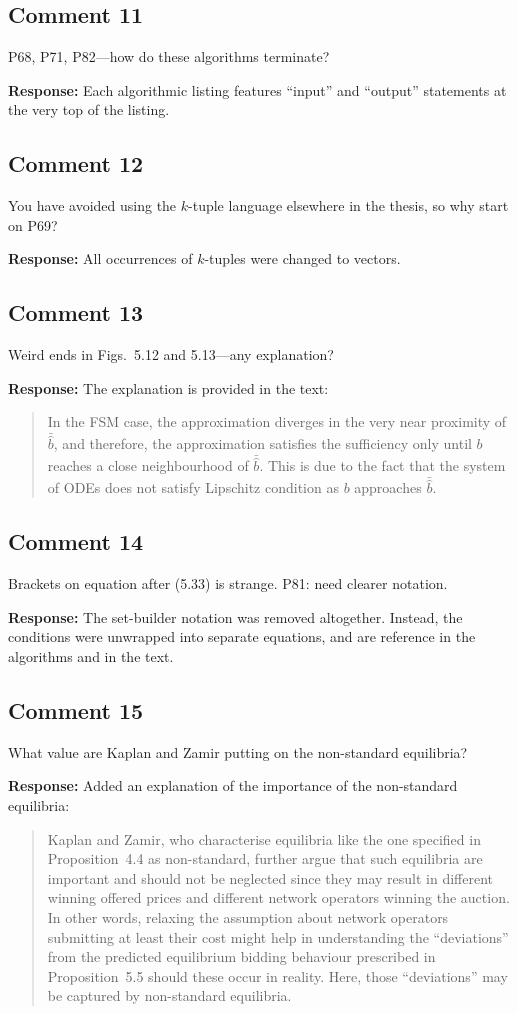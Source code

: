 \documentclass[10pt,a4paper,notitlepage]{article}
\numberwithin{equation}{section}
\begin{document}
\subsection{Comment 11}
P68, P71, P82---how do these algorithms terminate?

\textbf{Response:}
Each algorithmic listing features ``input'' and ``output'' statements at the very top of the listing.

\subsection{Comment 12}
You have avoided using the $k$-tuple language elsewhere in the thesis, so why start on P69?

\textbf{Response:}
All occurrences of $k$-tuples were changed to vectors.

\subsection{Comment 13}
Weird ends in Figs.~5.12 and 5.13---any explanation?

\textbf{Response:}
The explanation is provided in the text:
\begin{quote}
In the FSM case, the approximation diverges in the very near proximity of $\bar{\hat{b}}$, and therefore, the approximation satisfies the sufficiency only until $b$ reaches a close neighbourhood of $\bar{\hat{b}}$. This is due to the fact that the system of ODEs does not satisfy Lipschitz condition as $b$ approaches $\bar{\hat{b}}$.
\end{quote}

\subsection{Comment 14}
Brackets on equation after (5.33) is strange. P81: need clearer notation.

\textbf{Response:}
The set-builder notation was removed altogether. Instead, the conditions were unwrapped into separate equations, and are reference in the algorithms and in the text.

\subsection{Comment 15}
What value are Kaplan and Zamir putting on the non-standard equilibria?

\textbf{Response:}
Added an explanation of the importance of the non-standard equilibria:
\begin{quote}
Kaplan and Zamir, who characterise equilibria like the one specified in Proposition~4.4 as non-standard, further argue that such equilibria are important and should not be neglected since they may result in different winning offered prices and different network operators winning the auction. In other words, relaxing the assumption about network operators submitting at least their cost might help in understanding the ``deviations'' from the predicted equilibrium bidding behaviour prescribed in Proposition~5.5 should these occur in reality. Here, those ``deviations'' may be captured by non-standard equilibria.
\end{quote}
\end{document}

